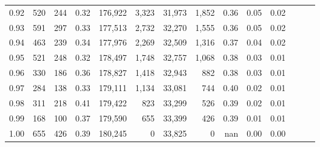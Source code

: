 \begin{tabular}{rrrrrrrrrrrrrr}
0.92 &    520 &  244 &  0.32 &  176,922 &    3,323 &  31,973 &   1,852 &  0.36 &  0.05 &      0.02 \\
0.93 &    591 &  297 &  0.33 &  177,513 &    2,732 &  32,270 &   1,555 &  0.36 &  0.05 &      0.02 \\
0.94 &    463 &  239 &  0.34 &  177,976 &    2,269 &  32,509 &   1,316 &  0.37 &  0.04 &      0.02 \\
0.95 &    521 &  248 &  0.32 &  178,497 &    1,748 &  32,757 &   1,068 &  0.38 &  0.03 &      0.01 \\
0.96 &    330 &  186 &  0.36 &  178,827 &    1,418 &  32,943 &     882 &  0.38 &  0.03 &      0.01 \\
0.97 &    284 &  138 &  0.33 &  179,111 &    1,134 &  33,081 &     744 &  0.40 &  0.02 &      0.01 \\
0.98 &    311 &  218 &  0.41 &  179,422 &      823 &  33,299 &     526 &  0.39 &  0.02 &      0.01 \\
0.99 &    168 &  100 &  0.37 &  179,590 &      655 &  33,399 &     426 &  0.39 &  0.01 &      0.01 \\
1.00 &    655 &  426 &  0.39 &  180,245 &        0 &  33,825 &       0 &   nan &  0.00 &      0.00 \\
\bottomrule
\end{tabular}

